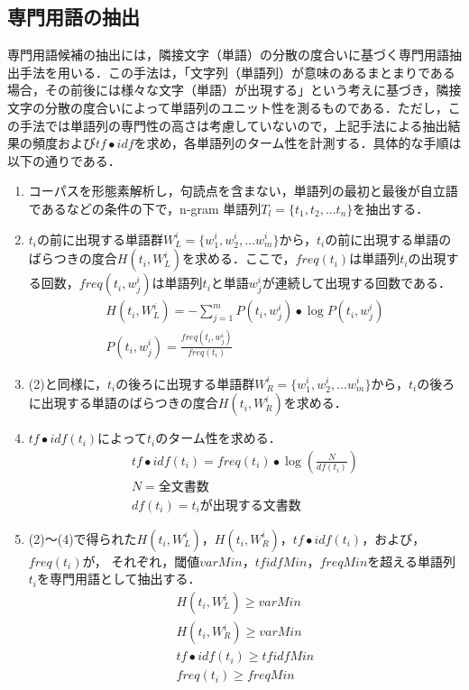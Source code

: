\documentclass[japanese]{jnlp_1.3e}
\begin{document}
\subsection{専門用語の抽出}\label{sec:extractTerm}

専門用語候補の抽出には，隣接文字（単語）の分散の度合いに基づく専門用語抽出手法\cite{Shimohata97}を用いる．この手法は，「文字列（単語列）が意味のあるまとまりである場合，その前後には様々な文字（単語）が出現する」という考えに基づき，隣接文字の分散の度合いによって単語列のユニット性を測るものである．ただし，この手法では単語列の専門性の高さは考慮していないので，上記手法による抽出結果の頻度および$\mathit{tf} \bullet \mathit{idf}$を求め，各単語列のターム性を計測する．具体的な手順は以下の通りである．

\begin{enumerate}
\item コーパスを形態素解析し，句読点を含まない，単語列の最初と最後が自立語であるなどの条件の下で，n-gram 単語列$T_{l} = \{t_{1}, t_{2},...t_{n} \}$を抽出する．
\item $t_{i}$の前に出現する単語群$W^{i}_{L} = \{w^{i}_{1}, w^{i}_{2},…w^{i}_{m}\}$から，$t_{i}$の前に出現する単語のばらつきの度合$H(t_{i},W^{i}_{L})$を求める．ここで，$\mathit{freq}(t_{i})$は単語列$t_{i}$の出現する回数，$\mathit{freq}(t_{i},w^{i}_{j})$は単語列$t_{i}$と単語$w^{i}_{j}$が連続して出現する回数である．
\begin{gather}
 H(t_{i},W^{i}_{L}) = - \sum^{m}_{j=1} P(t_{i},w^{i}_{j}) \bullet \log P(t_{i},w^{i}_{j}) \\
 P(t_{i},w^{i}_{j}) = \frac{ \mathit{freq}(t_{i},w^{i}_{j}) }{ \mathit{freq}(t_{i}) }
\end{gather}

\item  (2)と同様に，$t_{i}$の後ろに出現する単語群$W^{i}_{R} =\{w^{i}_{1}, w^{i}_{2},…w^{i}_{m}\} $から，$t_{i}$の後ろに出現する単語のばらつきの度合$H(t_{i},W^{i}_{R})$を求める．

\item $\mathit{tf} \bullet \mathit{idf}(t_{i})$によって$t_{i}$のターム性を求める．
\begin{gather}
\mathit{tf} \bullet \mathit{idf}(t_{i}) = \mathit{freq}(t_{i}) \bullet \log ( \frac{N}{\mathit{df}(t_{i})}) \\
N = 全文書数 \nonumber \\
\mathit{df}(t_{i})=t_{i}が出現する文書数 \nonumber
\end{gather}

\item (2)〜(4)で得られた$H(t_{i},W^{i}_{L})$，$H(t_{i},W^{i}_{R})$，$tf \bullet \mathit{idf}(t_{i})$，および，$\mathit{freq}(t_{i})$が，
それぞれ，閾値$\mathit{varMin}$，$\mathit{tfidfMin}$，$\mathit{freqMin}$を超える単語列$t_{i}$を専門用語として抽出する．
\pagebreak
\begin{gather*}
 H(t_{i},W^{i}_{L}) \geq \mathit{varMin} \\
 H(t_{i},W^{i}_{R}) \geq \mathit{varMin} \\
 \mathit{tf} \bullet \mathit{idf}(t_{i}) \geq \mathit{tfidfMin} \\
 \mathit{freq}(t_{i}) \geq \mathit{freqMin} 
\end{gather*}


\end{enumerate}
\end{document}
